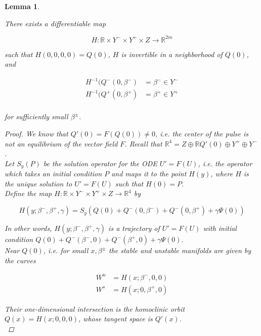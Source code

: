 \documentclass[12pt]{article}
\def\R{{\mathbb R}}
\newtheorem{lemma}{Lemma}
\begin{document}
\begin{lemma}\label{straightenW}

There exists a differentiable map 

\[
H: \R \times Y^- \times Y^+ \times Z \rightarrow \R^{2m}
\]

such that $H(0, 0, 0, 0) = Q(0)$, $H$ is invertible in a neighborhood of $Q(0)$, and

\begin{align*}
H^{-1}(Q^-(0, \beta^-) &= \beta^- \in Y^- \\
H^{-1}(Q^+(0, \beta^+) &= \beta^+ \in Y^+ \\
\end{align*}

for sufficiently small $\beta^\pm$.

\begin{proof}
We know that $Q'(0) = F(Q(0)) \neq 0$, i.e. the center of the pulse is not an equilibrium of the vector field $F$. Recall that $\R^4 = Z \oplus \R Q'(0) \oplus Y^+ \oplus Y^-$.\\

Let $S_y(P)$ be the solution operator for the ODE $U' = F(U)$, i.e. the operator which takes an initial condition $P$ and maps it to the point $H(y)$, where $H$ is the unique solution to $U' = F(U)$ such that $H(0) = P$.\\

Define the map $H: \R \times Y^- \times Y^+ \times Z \rightarrow \R^4$ by 

\begin{equation}
H(y; \beta^-, \beta^+, \gamma) = S_y(Q(0) + Q^-(0, \beta^-) + Q^-(0, \beta^+) + \gamma \Psi(0))
\end{equation}

In other words, $H(y; \beta^-, \beta^+, \gamma)$ is a trajectory of $U' = F(U)$ with initial condition $Q(0) + Q^-(\beta^-,0) + Q^-(\beta^+,0) + \gamma \Psi(0)$.\\ 

Near $Q(0)$, i.e. for small $x, \beta^\pm$ the stable and unstable manifolds are given by the curves

\begin{align*}
W^u &= H(x; \beta^-, 0, 0) \\
W^s &= H(x; 0, \beta^+, 0) 
\end{align*}

Their one-dimensional intersection is the homoclinic orbit $Q(x) = H(x; 0, 0, 0)$, whose tangent space is $Q'(x)$.\\


\end{proof}
\end{lemma}
\end{document}
